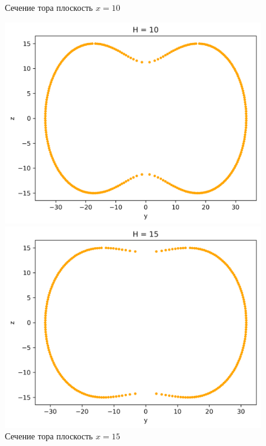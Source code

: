 \documentclass[a4]{article}
\begin{document}
\begin{figure}[H]
\caption{Сечение тора плоскость $x=10$ }
\includegraphics[scale=0.9]{TS10.png} 

\caption{Сечение тора плоскость $x=15$ }
\includegraphics[scale=0.9]{TS15.png} 
\end{figure}
\end{document}

